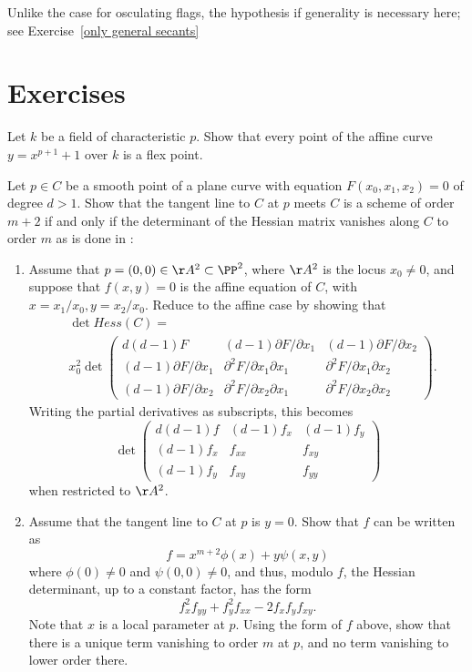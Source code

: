 Unlike the case for osculating flags, the hypothesis if generality is necessary here; see Exercise~\ref{only general secants}



\section{Exercises}
\begin{exercise}\label{inseparable Gauss}
Let $k$ be a field of characteristic $p$. Show that every point of the affine curve $y = x^{p+1}+1$ over $k$ is a flex point.
 
\end{exercise}

\begin{exercise}\label{Hessian exercise} 
Let $p\in C$ be a smooth point of a  plane curve with equation $F(x_0,x_1,x_2) = 0$ of degree $d>1$. Show that the tangent line to $C$ at $p$ meets
$C$ is a scheme of order $m+2$ if and only if the determinant of the Hessian matrix vanishes
along $C$ to order $m$ as is done in \cite[pp. 84--85]{Kunz}:

\begin{enumerate}
\item Assume that $p = (0,0)\in \AA^2\subset \PP^2$, where $\AA^2$ is the locus $x_0\neq 0$, 
and suppose that $f(x,y) =0$ is the affine equation of $C$, with $x= x_1/x_0, y = x_2/x_0$.
Reduce to the affine case by showing that
$$
\begin{aligned}
&\det Hess(C) = \\
&x_0^2 \det 
\begin{pmatrix}
 d(d-1)F & (d-1) \partial F/\partial x_1 & (d-1) \partial F/\partial x_2 \\
 (d-1) \partial F/\partial x_1&\partial^2 F/\partial x_1 \partial x_1 & \partial^2 F/\partial x_1 \partial x_2\\
 (d-1) \partial F/\partial x_2 &\partial^2 F/\partial x_2 \partial x_1 & \partial^2 F/\partial x_2 \partial x_2 
\end{pmatrix} .
\end{aligned}
$$ 
Writing the partial derivatives as subscripts, this becomes
$$
\det \begin{pmatrix}
 d(d-1)f & (d-1) f_x & (d-1) f_y \\
 (d-1) f_x&f_{xx} & f_{xy}\\
 (d-1) f_y &f_{xy} & f_{yy}
\end{pmatrix}
$$ 
when restricted to $\AA^2$.

\item Assume that the tangent line to $C$ at $p$ is $y=0$. Show that $f$ can be written as
$$
f = x^{m+2}\phi(x) +y\psi(x,y)
$$
where $\phi(0) \neq 0$ and $\psi(0,0) \neq 0$, and thus, modulo $f$, the Hessian determinant,
up to a constant factor, 
has the form
$$
f_x^2f_{yy}+f_y^2f_{xx}-2f_xf_yf_{xy}.
$$
Note that $x$ is a local parameter at $p$. Using the form of $f$ above, show that there is a unique term vanishing to order $m$ at $p$,
and no term vanishing to lower order there.
\end{enumerate}
\end{exercise}

